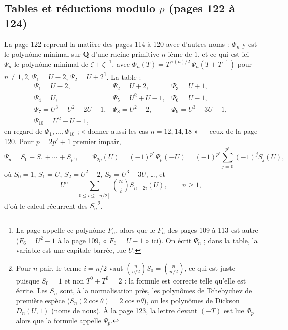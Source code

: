 \documentclass[11pt,a4paper]{article}
\begin{document}
\subsection*{Tables et réductions modulo $p$ (pages 122 à 124)}

La page 122 reprend la matière des pages 114 à 120 avec d'autres noms :
$\Phi_n$ y est le polynôme minimal sur $\mathbf{Q}$ d'une racine primitive
$n$-ième de $1$, et ce qui est ici $\Psi_n$ le polynôme minimal de $\zeta +
\zeta^{-1}$, avec $\Phi_n(T) = T^{\varphi(n)/2}\, \Psi_n(T + T^{-1})$ pour $n
\neq 1, 2$, $\Psi_1 = U - 2$, $\Psi_2 = U + 2$\footnote{La page appelle ce
polynôme $F_n$, alors que le $F_n$ des pages 109 à 113 est autre ($F_6 = U^2 -
1$ à la page 109, « $F_6 = U - 1$ » ici). On écrit $\Psi_n$ ; dans la table,
la variable est une capitale barrée, lue $U$.}. La table :
\[
\begin{array}{lll}
\Psi_1 = U - 2, & \Psi_2 = U + 2, & \Psi_3 = U + 1, \\
\Psi_4 = U, & \Psi_5 = U^2 + U - 1, & \Psi_6 = U - 1, \\
\Psi_7 = U^3 + U^2 - 2U - 1, & \Psi_8 = U^2 - 2, & \Psi_9 = U^3 - 3U + 1, \\
\Psi_{10} = U^2 - U - 1, & &
\end{array}
\]
en regard de $\Phi_1, \ldots, \Phi_{10}$ ; « donner aussi les cas $n = 12, 14,
18$ » --- ceux de la page 120. Pour $p = 2p' + 1$ premier impair,
\[
  \Psi_p = S_0 + S_1 + \cdots + S_{p'}, \qquad
  \Psi_{2p}(U) = (-1)^{p'}\, \Psi_p(-U) = (-1)^{p'} \sum_{j=0}^{p'} (-1)^j S_j(U),
\]
où $S_0 = 1$, $S_1 = U$, $S_2 = U^2 - 2$, $S_3 = U^3 - 3U$, \ldots, et
\[
  U^n = \sum_{0 \leq i \leq [n/2]} \binom{n}{i} S_{n-2i}(U), \qquad n \geq 1 ,
\]
d'où le calcul récurrent des $S_n$\footnote{Pour $n$ pair, le terme $i = n/2$
vaut $\binom{n}{n/2} S_0 = \binom{n}{n/2}$, ce qui est juste puisque $S_0 =
1$ et non $T^0 + T^0 = 2$ : la formule est correcte telle qu'elle est écrite.
Les $S_n$ sont, à la normalisation près, les polynômes de Tchebychev de
première espèce ($S_n(2\cos\theta) = 2\cos n\theta$), ou les polynômes de
Dickson $D_n(U, 1)$ (noms de nous). À la page 123, la lettre devant $(-T)$ est
lue $\Phi_p$ alors que la formule appelle $\Psi_p$.}.
\end{document}

